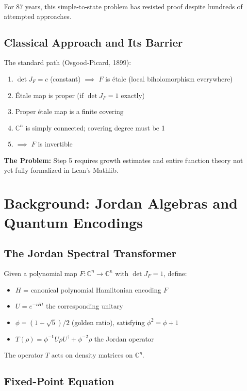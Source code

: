 \documentclass[11pt,a4paper]{article}
\theoremstyle{plain}
\theoremstyle{definition}
\newcommand{\CC}{\mathbb{C}}
\begin{document}
For 87 years, this simple-to-state problem has resisted proof despite hundreds of attempted approaches.

\subsection{Classical Approach and Its Barrier}

The standard path (Osgood-Picard, 1899):
\begin{enumerate}
  \item $\det J_F = c$ (constant) $\implies$ $F$ is étale (local biholomorphism everywhere)
  \item Étale map is proper (if $\det J_F = 1$ exactly)
  \item Proper étale map is a finite covering
  \item $\CC^n$ is simply connected; covering degree must be 1
  \item $\implies$ $F$ is invertible
\end{enumerate}

\textbf{The Problem:} Step 5 requires growth estimates and entire function theory not yet fully formalized in Lean's Mathlib.

\section{Background: Jordan Algebras and Quantum Encodings}

\subsection{The Jordan Spectral Transformer}

Given a polynomial map $F : \CC^n \to \CC^n$ with $\det J_F = 1$, define:
\begin{itemize}
  \item $H$ = canonical polynomial Hamiltonian encoding $F$
  \item $U = e^{-iHt}$ the corresponding unitary
  \item $\phi = (1 + \sqrt{5})/2$ (golden ratio), satisfying $\phi^2 = \phi + 1$
  \item $T(\rho) = \phi^{-1} U \rho U^\dagger + \phi^{-2} \rho$ the Jordan operator
\end{itemize}

The operator $T$ acts on density matrices on $\CC^n$.

\subsection{Fixed-Point Equation}
\end{document}
